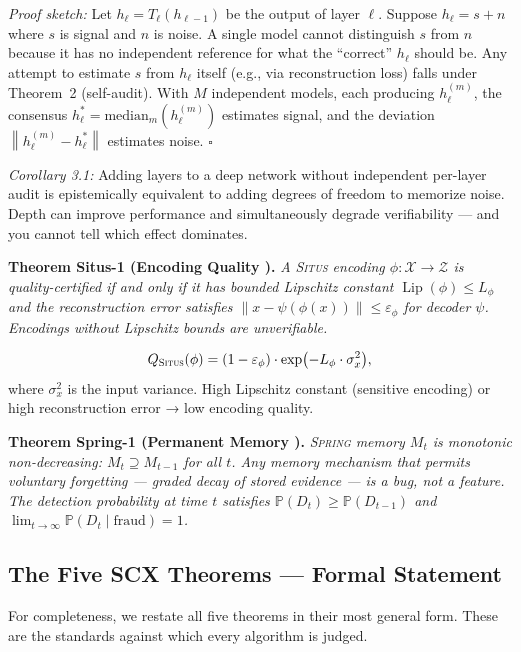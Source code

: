 \documentclass[12pt,a4paper]{article}
\theoremstyle{definition}
\newcommand{\Situs}{\textsc{Situs}}
\newcommand{\Spring}{\textsc{Spring}}
\DeclareMathOperator{\Lip}{Lip}
\newcommand{\Pbb}{\mathbb{P}}
\newcommand{\cX}{\mathcal{X}}
\newcommand{\cZ}{\mathcal{Z}}
\newcommand{\norm}[1]{\left\lVert#1\right\rVert}
\begin{document}
\textit{Proof sketch:} Let $h_\ell = T_\ell(h_{\ell-1})$ be the output of layer $\ell$. Suppose $h_\ell = s + n$ where $s$ is signal and $n$ is noise. A single model cannot distinguish $s$ from $n$ because it has no independent reference for what the ``correct'' $h_\ell$ should be. Any attempt to estimate $s$ from $h_\ell$ itself (e.g., via reconstruction loss) falls under Theorem~2 (self-audit). With $M$ independent models, each producing $h_\ell^{(m)}$, the consensus $h_\ell^* = \text{median}_m(h_\ell^{(m)})$ estimates signal, and the deviation $\norm{h_\ell^{(m)} - h_\ell^*}$ estimates noise. \hfill $\square$

\textit{Corollary 3.1:} Adding layers to a deep network without independent per-layer audit is epistemically equivalent to adding degrees of freedom to memorize noise. Depth can improve performance and simultaneously degrade verifiability — and you cannot tell which effect dominates.

\medskip
\noindent\textbf{Theorem Situs-1 (Encoding Quality ).} \textit{A \Situs{} encoding $\phi: \cX \to \cZ$ is quality-certified if and only if it has bounded Lipschitz constant $\Lip(\phi) \le L_\phi$ and the reconstruction error satisfies $\norm{x - \psi(\phi(x))} \le \varepsilon_\phi$ for decoder $\psi$. Encodings without Lipschitz bounds are unverifiable.}

\begin{equation}\label{eq:situs}
    Q_{\Situs}(\phi) = (1 - \varepsilon_\phi) \cdot \exp\bigl(-L_\phi \cdot \sigma_x^2\bigr),
\end{equation}
where $\sigma_x^2$ is the input variance. High Lipschitz constant (sensitive encoding) or high reconstruction error → low encoding quality.

\medskip
\noindent\textbf{Theorem Spring-1 (Permanent Memory ).} \textit{\Spring{} memory $M_t$ is monotonic non-decreasing: $M_t \supseteq M_{t-1}$ for all $t$. Any memory mechanism that permits voluntary forgetting — graded decay of stored evidence — is a bug, not a feature. The detection probability at time $t$ satisfies $\Pbb(D_t) \ge \Pbb(D_{t-1})$ and $\lim_{t\to\infty}\Pbb(D_t \mid \text{fraud}) = 1$.}

\subsection{The Five SCX Theorems — Formal Statement }

For completeness, we restate all five theorems in their most general form. These are the standards against which every algorithm is judged.
\end{document}
